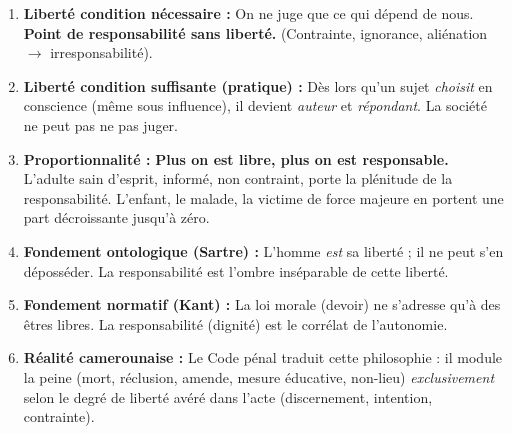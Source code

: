 \documentclass[11pt]{article}
\begin{document}
\begin{aretenir}
\begin{enumerate}
    \item \textbf{Liberté condition nécessaire :} On ne juge que ce qui dépend de nous. \textbf{Point de responsabilité sans liberté.} (Contrainte, ignorance, aliénation $\rightarrow$ irresponsabilité).
    \item \textbf{Liberté condition suffisante (pratique) :} Dès lors qu'un sujet \emph{choisit} en conscience (même sous influence), il devient \emph{auteur} et \emph{répondant}. La société ne peut pas ne pas juger.
    \item \textbf{Proportionnalité :} \textbf{Plus on est libre, plus on est responsable.} L'adulte sain d'esprit, informé, non contraint, porte la plénitude de la responsabilité. L'enfant, le malade, la victime de force majeure en portent une part décroissante jusqu'à zéro.
    \item \textbf{Fondement ontologique (Sartre) :} L'homme \emph{est} sa liberté ; il ne peut s'en déposséder. La responsabilité est l'ombre inséparable de cette liberté.
    \item \textbf{Fondement normatif (Kant) :} La loi morale (devoir) ne s'adresse qu'à des êtres libres. La responsabilité (dignité) est le corrélat de l'autonomie.
    \item \textbf{Réalité camerounaise :} Le Code pénal traduit cette philosophie : il module la peine (mort, réclusion, amende, mesure éducative, non-lieu) \emph{exclusivement} selon le degré de liberté avéré dans l'acte (discernement, intention, contrainte).
\end{enumerate}
\end{aretenir}
\end{document}
